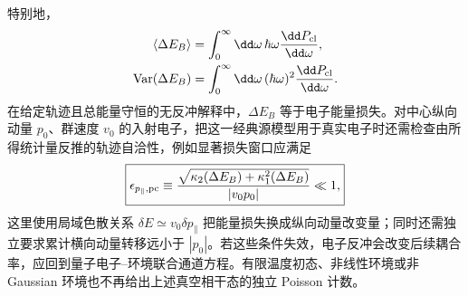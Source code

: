 特别地，
\begin{align}
 \langle\Delta E_B\rangle
 &=\int_0^\infty\dd\omega\,\hbar\omega
 \frac{\dd P_{\rm cl}}{\dd\omega},\\
 \operatorname{Var}(\Delta E_B)
 &=\int_0^\infty\dd\omega\,(\hbar\omega)^2
 \frac{\dd P_{\rm cl}}{\dd\omega}.
 \label{eq:green-loss-mean-variance-dp84}
\end{align}
在给定轨迹且总能量守恒的无反冲解释中，$\Delta E_B$ 等于电子能量损失。对中心纵向动量 $p_0$、群速度 $v_0$ 的入射电子，把这一经典源模型用于真实电子时还需检查由所得统计量反推的轨迹自洽性，例如显著损失窗口应满足
\begin{equation}
 \boxed{
 \epsilon_{p_\parallel,\rm pc}
 \equiv
 \frac{\sqrt{\kappa_2(\Delta E_B)+\kappa_1^2(\Delta E_B)}}{|v_0p_0|}
 \ll1,}
 \label{eq:prescribed-current-energy-selfconsistency-dp85}
\end{equation}
这里使用局域色散关系 $\delta E\simeq v_0\delta p_\parallel$ 把能量损失换成纵向动量改变量；同时还需独立要求累计横向动量转移远小于 $|p_0|$。若这些条件失效，电子反冲会改变后续耦合率，应回到量子电子--环境联合通道方程。有限温度初态、非线性环境或非 Gaussian 环境也不再给出上述真空相干态的独立 Poisson 计数。

